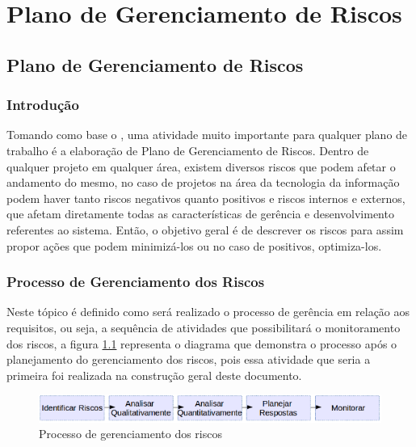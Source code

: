 \part{Plano de Gerenciamento de Riscos}
\chapter[Plano de Gerenciamento de Riscos]{Plano de Gerenciamento de Riscos}

\section{Introdução}

Tomando como base o \cite{pmbok2013guia}, uma atividade muito importante para qualquer plano de trabalho é a elaboração de Plano de Gerenciamento de Riscos. Dentro de qualquer projeto em qualquer área, existem diversos riscos que podem afetar o andamento do mesmo, no caso de projetos na área da tecnologia da informação podem haver tanto riscos negativos quanto positivos e riscos internos e externos, que afetam diretamente todas as características de gerência e desenvolvimento referentes ao sistema. Então, o objetivo geral é de descrever os riscos para assim propor ações que podem minimizá-los ou no caso de positivos, optimiza-los.

\section{Processo de Gerenciamento dos Riscos}

Neste tópico é definido como será realizado o processo de gerência em relação aos requisitos, ou seja, a sequência de atividades que possibilitará o monitoramento dos riscos, a figura \ref{fig:plano} representa o diagrama que demonstra o processo após o planejamento do gerenciamento dos riscos, pois essa atividade que seria a primeira foi realizada na construção geral deste documento.

\begin{figure}[h!]
	\centering
	\includegraphics[width=\textwidth]{figuras/plano.png}
	\caption{Processo de gerenciamento dos riscos}
	\label{fig:plano}
\end{figure}

